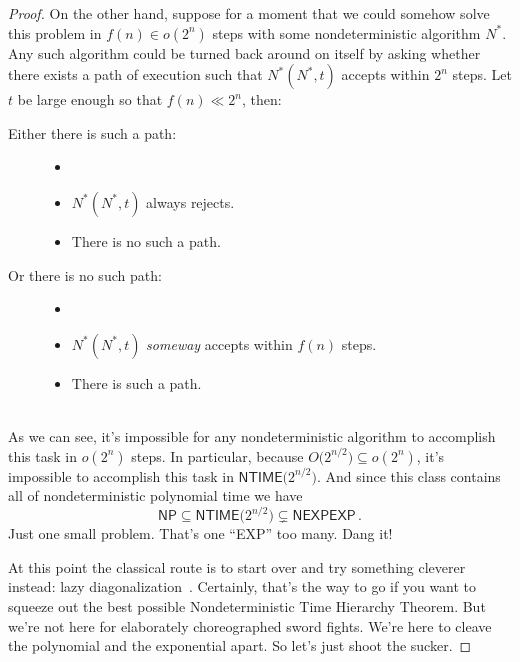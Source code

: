 \documentclass{article}
\theoremstyle{customstyle}
\newcommand{\NTIME}{\ensuremath{\textsf{NTIME}}}
\newcommand{\NP}{\ensuremath{\textsf{NP}}}
\newcommand{\NEXPEXP}{\ensuremath{\textsf{NEXPEXP}}}
\begin{document}
\begin{proof}
On the other hand, suppose for a moment that we could somehow solve this problem in $f(n) \in o(2^n)$ steps with some nondeterministic algorithm $N^*$. Any such algorithm could be turned back around on itself by asking whether there exists a path of execution such that $N^*(N^*, t)$ accepts within $2^n$ steps. Let $t$ be large enough so that $f(n) \ll 2^n$, then:\\[0.5em]
\begin{minipage}{0.4\textwidth}
\begin{description}
\item[Either there is such a path:]
\begin{itemize}
\item[]
\item $N^*(N^*, t)$ always rejects.
\item There is no such a path. \lightning
\end{itemize}
\end{description}
\end{minipage}
\begin{minipage}{0.55\textwidth}
\begin{description}
\item[Or there is no such path:]
\begin{itemize}
\item[]
\item $N^*(N^*, t)$ \textit{someway} accepts within $f(n)$ steps.
\item There is such a path. \lightning
\end{itemize}
\end{description}
\end{minipage}\\[1em]
As we can see, it's impossible for any nondeterministic algorithm to accomplish this task in $o(2^n)$ steps. In particular, because $O\bigl(2^{n/2}\bigr) \subseteq o(2^n)$, it's impossible to accomplish this task in $\NTIME\bigl(2^{n/2}\bigr)$. And since this class contains all of nondeterministic polynomial time we have
\[
\NP \subseteq \NTIME\bigl(2^{n/2}\bigr) \subsetneq \NEXPEXP\,.
\]
Just one small problem. That's one ``\textsf{EXP}'' too many. Dang it!

At this point the classical route is to start over and try something cleverer instead: lazy diagonalization~\cite{stanislav}. Certainly, that's the way to go if you want to squeeze out the best possible Nondeterministic Time Hierarchy Theorem. But we're not here for elaborately choreographed sword fights. We're here to cleave the polynomial and the exponential apart. So let's just shoot the sucker.


\end{proof}
\end{document}
